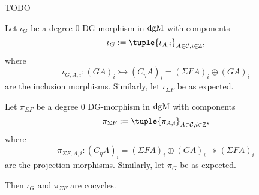 TODO

\begin{remark}
    \label{rem:dgm_differentials_of_inclusions_and_projections_of_cone}
    Let \( \iota_G \) be a degree \( 0 \) DG-morphism in \( \operatorname{dgM} \) with components
    \[
        \iota_G := \tuple{ \iota_{A, i} }_{A \in \Cc, i \in \Zb},
    \]
    where
    \[
        \iota_{G, A, i}: (G A)_i \rightarrowtail (C_{\eta} A)_i = (\Sigma F A)_i \oplus (G A)_i
    \]
    are the inclusion morphisms. Similarly, let \( \iota_{\Sigma F} \) be as expected.
    
    Let \( \pi_{\Sigma F} \) be a degree \( 0 \) DG-morphism in \( \operatorname{dgM} \) with components
    \[
        \pi_{\Sigma F} := \tuple{ \pi_{A, i} }_{A \in \Cc, i \in \Zb},
    \]
    where
    \[
        \pi_{\Sigma F, A, i}: (C_{\eta} A)_i = (\Sigma F A)_i \oplus (G A)_i \twoheadrightarrow (\Sigma F A)_i
    \]
    are the projection morphisms. Similarly, let \( \pi_G \) be as expected.

    Then \( \iota_G \) and \( \pi_{\Sigma F} \) are cocycles.


\end{remark}
